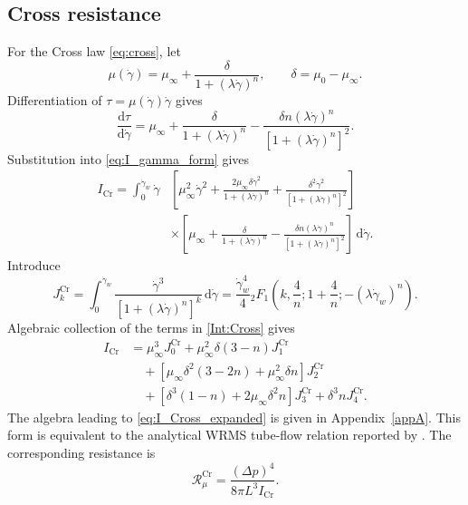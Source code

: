 \documentclass[lineno]{jfm}
\begin{document}
\subsection{Cross resistance}
For the Cross law \eqref{eq:cross}, let
\begin{equation}
\mu(\dot{\gamma})
=
\mu_{\infty}
+
\frac{\delta}
{1+(\lambda\dot{\gamma})^n},
\qquad
\delta
=
\mu_0-\mu_\infty .
\label{eq:cross_delta}
\end{equation}
Differentiation of
$\tau=\mu(\dot{\gamma})\dot{\gamma}$ gives
\begin{equation}
\frac{\mathrm{d}\tau}{\mathrm{d}\dot{\gamma}}
=
\mu_\infty
+
\frac{\delta}
{1+(\lambda\dot{\gamma})^n}
-
\frac{
\delta n(\lambda\dot{\gamma})^n
}{
\left[1+(\lambda\dot{\gamma})^n\right]^2
}.
\label{eq:dtau_dgamma_Cross}
\end{equation}
Substitution into \eqref{eq:I_gamma_form} gives
\begin{align}
I_{\mathrm{Cr}}
=
\int_0^{\dot{\gamma}_w}
\dot{\gamma}
&\left[
\mu_\infty^2\dot{\gamma}^2
+
\frac{
2\mu_\infty\delta\dot{\gamma}^2
}{
1+(\lambda\dot{\gamma})^n
}
+
\frac{
\delta^2\dot{\gamma}^2
}{
\left[1+(\lambda\dot{\gamma})^n\right]^2
}
\right]
\nonumber\\
&\times
\left[
\mu_\infty
+
\frac{\delta}
{1+(\lambda\dot{\gamma})^n}
-
\frac{
\delta n(\lambda\dot{\gamma})^n
}{
\left[1+(\lambda\dot{\gamma})^n\right]^2
}
\right]
\,\mathrm{d}\dot{\gamma}.
\label{Int:Cross}
\end{align}
Introduce
\begin{equation}
J_k^{\mathrm{Cr}}
=
\int_0^{\dot{\gamma}_w}
\frac{
\dot{\gamma}^3
}{
\left[1+(\lambda\dot{\gamma})^n\right]^k
}
\,\mathrm{d}\dot{\gamma}
=
\frac{\dot{\gamma}_w^4}{4}
{}_2F_1\!\left(
k,\frac{4}{n};
1+\frac{4}{n};
-(\lambda\dot{\gamma}_w)^n
\right).
\label{eq:Jk_Cross}
\end{equation}
Algebraic collection of the terms in \eqref{Int:Cross} gives
\begin{align}
I_{\mathrm{Cr}}
&=
\mu_{\infty}^3J_0^{\mathrm{Cr}}
+
\mu_{\infty}^2\delta(3-n)J_1^{\mathrm{Cr}}
\nonumber\\
&\quad
+
\left[
\mu_{\infty}\delta^2(3-2n)
+
\mu_{\infty}^2\delta n
\right]
J_2^{\mathrm{Cr}}
\nonumber\\
&\quad
+
\left[
\delta^3(1-n)
+
2\mu_{\infty}\delta^2n
\right]
J_3^{\mathrm{Cr}}
+
\delta^3nJ_4^{\mathrm{Cr}}.
\label{eq:I_Cross_expanded}
\end{align}
The algebra leading to \eqref{eq:I_Cross_expanded} is given in
Appendix~\ref{appA}. This form is equivalent to the analytical WRMS
tube-flow relation reported by \citet{Sochi2015}. The corresponding resistance
is
\begin{equation}
\mathcal{R}_{\mu}^{\mathrm{Cr}}
=
\frac{(\Delta p)^4}
{8\pi L^3 I_{\mathrm{Cr}}}.
\label{eq:R_Cr}
\end{equation}
\end{document}
